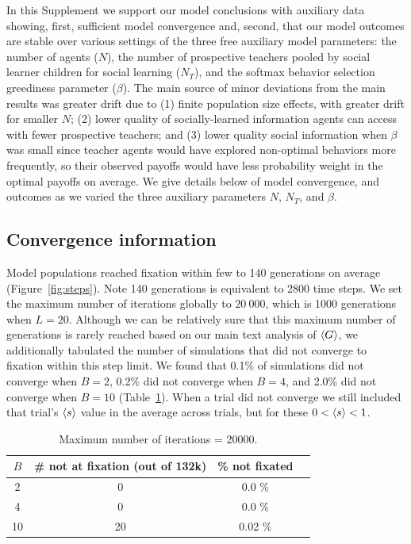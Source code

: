\documentclass[letterpaper,11.5pt]{scrartcl}
\begin{document}
In this Supplement we support our model conclusions with auxiliary data
showing, first, sufficient model convergence and, second, that our model
outcomes are stable over various settings of the three free auxiliary model
parameters: the number of agents ($N$), the number of
prospective teachers pooled by social learner children for social learning
($N_T$), and the softmax behavior selection greediness parameter ($\beta$).
The main source of minor deviations from the main results was greater drift
due to (1) finite population size effects, with greater drift for smaller $N$;
(2) lower quality of socially-learned information agents can access with fewer
prospective teachers; and (3) lower quality social information when $\beta$
was small since teacher agents would have explored non-optimal behaviors more
frequently, so their observed payoffs would have less probability weight in
the optimal payoffs on average. We give details below of model convergence, and
outcomes as we varied the three auxiliary parameters $N$, $N_T$, and $\beta$.


\subsection{Convergence information}

Model populations reached fixation within few to 140 generations on
average (Figure~\ref{fig:steps}).
Note 140 generations is equivalent to 2800 time steps. We set the maximum 
number of iterations globally to $20~000$, which is 1000 generations when
$L=20$. Although we can be relatively sure that this maximum number of 
generations is rarely reached based on our main text analysis of $\langle G \rangle$,
we additionally tabulated the number of simulations that did not converge to
fixation
within this step limit. We found that 0.1\% of simulations did not converge
when $B=2$, 0.2\% did not converge when $B=4$, and 2.0\% did not converge
when $B=10$ (Table~\ref{tab:convergence}). When a trial did not converge we
still included that trial's $\langle s \rangle$ value in the average across trials,
but for these $0 < \langle s \rangle < 1$.

\begin{table}[h] \caption{Maximum number of iterations = 20000.} \label{tab:convergence} \centering
  \begin{tabular}{cccc} 
    \toprule $B$ & \# not at fixation (out of 132k) & \% not fixated \\ 
    \midrule  2  & 0  & 0.0 \% \\ 
              4  & 0  & 0.0 \% \\ 
              10 & 20 & 0.02 \% \\ 
    \bottomrule \end{tabular} 
\end{table}
\end{document}
